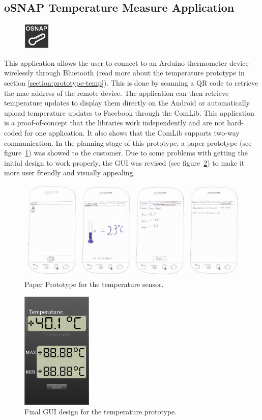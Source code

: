 \subsection{oSNAP Temperature Measure Application}
\begin{figure}
	\centering \includegraphics[scale=1]{img/app-temp}
\end{figure}
This application allows the user to connect to an Arduino thermometer device wirelessly through Bluetooth (read more about the 
temperature prototype in section \ref{section:prototype-temp}). This is done by scanning a QR code to retrieve the mac address
 of the remote device. The application can then retrieve temperature updates to display them directly on the Android or automatically 
upload temperature updates to Facebook through the ComLib. This application is a proof-of-concept that the libraries work independently
 and are not hard-coded for one application. It also shows that the ComLib supports two-way communication.
In the planning stage of this prototype, a paper prototype (see figure~\ref{fig:prototype2-paper}) was showed to the
customer. Due to some problems with getting the initial design to work properly, the GUI was revised (see
figure~\ref{fig:prototype2-gui}) to make it more user friendly and visually appealing.

\begin{figure}[H]
\centering 
\includegraphics[width=1.0\textwidth]{img/prototype2-paper.png}
\caption{Paper Prototype for the temperature sensor.}
\label{fig:prototype2-paper}
\end{figure}

\begin{figure}[H]
\centering 
\includegraphics[width=0.3\textwidth]{img/prototype2-gui.png}
\caption{Final GUI design for the temperature prototype.}
\label{fig:prototype2-gui}
\end{figure}


